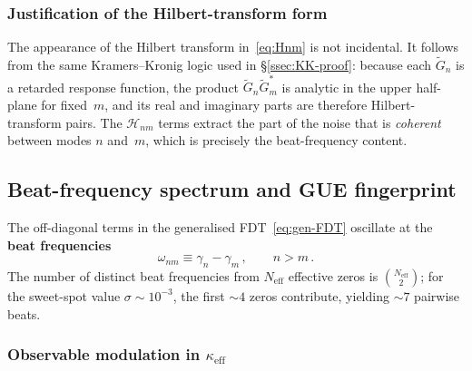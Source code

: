 \documentclass[12pt,a4paper]{article}
\begin{document}
\subsubsection{Justification of the Hilbert-transform form}%
\label{sssec:Hilbert-justification}

The appearance of the Hilbert transform in~\eqref{eq:Hnm} is not
incidental.  It follows from the same Kramers--Kronig logic used in
\S\ref{ssec:KK-proof}: because each $\widetilde{G}_{n}$ is a retarded
response function, the product
$\widetilde{G}_{n}\widetilde{G}_{m}^{*}$ is analytic in the upper
half-plane for fixed~$m$, and its real and imaginary parts are
therefore Hilbert-transform pairs.  The $\mathcal{H}_{nm}$ terms
extract the part of the noise that is \emph{coherent} between modes
$n$ and~$m$, which is precisely the beat-frequency content.

\subsection{Beat-frequency spectrum and GUE
  fingerprint}\label{ssec:beat-spectrum}

The off-diagonal terms in the generalised
FDT~\eqref{eq:gen-FDT} oscillate at the \textbf{beat frequencies}
\begin{equation}\label{eq:beat-freq}
  \omega_{nm} \equiv \gamma_{n}-\gamma_{m}\,,
  \qquad n>m\,.
\end{equation}
The number of distinct beat frequencies from $N_{\mathrm{eff}}$
effective zeros is $\binom{N_{\mathrm{eff}}}{2}$; for the sweet-spot
value $\sigma\sim 10^{-3}$, the first $\sim 4$ zeros contribute,
yielding $\sim 7$ pairwise beats.

\subsubsection{Observable modulation in $\kappa_{\mathrm{eff}}$}%
\label{sssec:observable-modulation}
\end{document}
